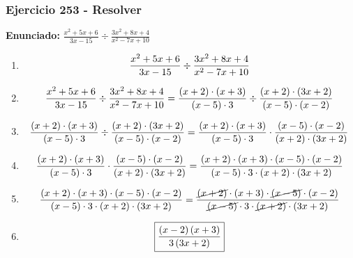 \documentclass[11pt,a4paper]{article}
\newcommand{\fitmath}[1]{%
\[
\setbox0=\hbox{$\displaystyle #1$}%
\ifdim\wd0>\linewidth
\resizebox{\linewidth}{!}{$\displaystyle #1$}%
\else
#1%
\fi
\]
}
\begin{document}
\subsubsection*{Ejercicio 253 - Resolver}
\textbf{Enunciado:} $ \frac{x^{2} + 5 x + 6}{3 x - 15} \div \frac{3 x^{2} + 8 x + 4}{x^{2} - 7 x + 10} $\par
\begin{enumerate}[leftmargin=2em]
\item \fitmath{\frac{x^{2} + 5 x + 6}{3 x - 15} \div \frac{3 x^{2} + 8 x + 4}{x^{2} - 7 x + 10}}
\item \fitmath{\frac{x^{2} + 5 x + 6}{3 x - 15} \div \frac{3 x^{2} + 8 x + 4}{x^{2} - 7 x + 10}= \frac{\left(x + 2\right)\cdot \left(x + 3\right)}{\left(x - 5\right)\cdot 3} \div \frac{\left(x + 2\right)\cdot \left(3 x + 2\right)}{\left(x - 5\right)\cdot \left(x - 2\right)}}
\item \fitmath{\frac{\left(x + 2\right)\cdot \left(x + 3\right)}{\left(x - 5\right)\cdot 3}\div \frac{\left(x + 2\right)\cdot \left(3 x + 2\right)}{\left(x - 5\right)\cdot \left(x - 2\right)}= \frac{\left(x + 2\right)\cdot \left(x + 3\right)}{\left(x - 5\right)\cdot 3}\cdot \frac{\left(x - 5\right)\cdot \left(x - 2\right)}{\left(x + 2\right)\cdot \left(3 x + 2\right)}}
\item \fitmath{\frac{\left(x + 2\right)\cdot \left(x + 3\right)}{\left(x - 5\right)\cdot 3}\cdot \frac{\left(x - 5\right)\cdot \left(x - 2\right)}{\left(x + 2\right)\cdot \left(3 x + 2\right)}= \frac{\left(x + 2\right)\cdot \left(x + 3\right)\cdot \left(x - 5\right)\cdot \left(x - 2\right)}{\left(x - 5\right)\cdot 3\cdot \left(x + 2\right)\cdot \left(3 x + 2\right)}}
\item \fitmath{\frac{\left(x + 2\right)\cdot \left(x + 3\right)\cdot \left(x - 5\right)\cdot \left(x - 2\right)}{\left(x - 5\right)\cdot 3\cdot \left(x + 2\right)\cdot \left(3 x + 2\right)}= \frac{\cancel{\left(x + 2\right)}\cdot \left(x + 3\right)\cdot \cancel{\left(x - 5\right)}\cdot \left(x - 2\right)}{\cancel{\left(x - 5\right)}\cdot 3\cdot \cancel{\left(x + 2\right)}\cdot \left(3 x + 2\right)}}
\item \fitmath{\boxed{\frac{\left(x - 2\right) \left(x + 3\right)}{3 \left(3 x + 2\right)}}}
\end{enumerate}

\vspace{0.12cm}
\end{document}
